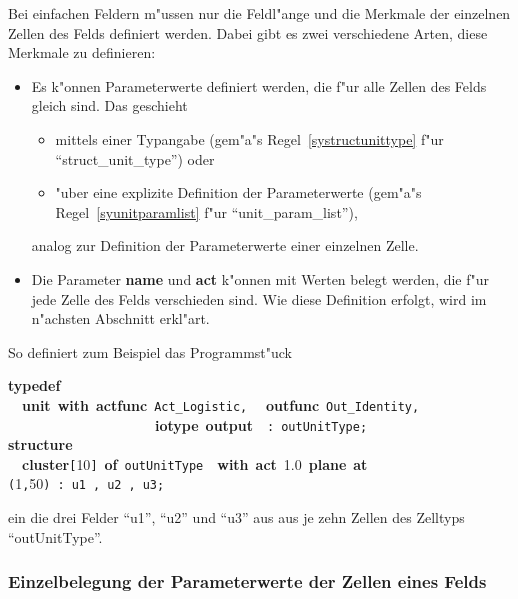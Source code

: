 Bei einfachen Feldern m"ussen nur die Feldl"ange und die
Merkmale der einzelnen Zellen des Felds definiert werden. Dabei gibt
es zwei verschiedene Arten, diese Merkmale zu definieren:

\begin{itemize}
  \item Es k"onnen Parameterwerte  definiert werden, die f"ur alle Zellen des Felds gleich sind. Das 
	geschieht 
	\begin{itemize}
	  \item mittels einer Typangabe (gem"a"s Regel~\ref{systructunittype} f"ur
	        ``struct\_unit\_type'') oder
	  \item "uber eine explizite Definition der
Parameterwerte (gem"a"s Regel~\ref{syunitparamlist} f"ur 
	        ``unit\_param\_list''),
	\end{itemize}
	analog zur Definition der Parameterwerte einer einzelnen Zelle.
  \item Die Parameter {\bf name} und {\bf act}
	k"onnen mit Werten belegt
	werden, die f"ur jede Zelle des Felds verschieden sind. Wie diese Definition erfolgt,
	wird im n"achsten Abschnitt erkl"art.
\end{itemize}

So definiert zum Beispiel das Programmst"uck\\
\begin{center}
\begin{tabbing}
{\bf typedef}\\
~~{\bf unit}~{\bf with}~{\bf actfunc}~\verb&Act_Logistic&\verb&,&~~{\bf
	outfunc}~\verb&Out_Identity&\verb&,&~~~~\\
~~~~~~~~~~~~~~~~~~~~~{\bf iotype}~{\bf output}~~\verb&:&~\verb&outUnitType&\verb&;&\\ 
{\bf structure}\\[.15cm]
~~{\bf cluster}\verb&[&10\verb&]&~{\bf of}~\verb&outUnitType&~~{\bf with}~{\bf act}~1.0~{\bf plane}~{\bf at}~
	\verb&(&1\verb&,&50\verb&)&~\verb&:&~\verb&u1&~\verb&,&~\verb&u2&~\verb&,&~\verb&u3&\verb&;&\\
\end{tabbing}
\end{center}

ein die drei Felder ``u1'', ``u2'' und ``u3'' aus aus je zehn Zellen
des Zelltyps ``outUnitType''.

\subsubsection{Einzelbelegung der Parameterwerte der Zellen eines
Felds}

